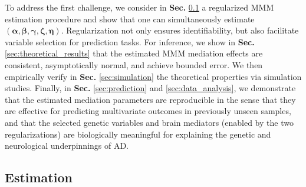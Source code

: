 \documentclass[
  12pt]{article}
\def\M{\mathbf{m}}
\begin{document}
To address the first challenge, we consider in \textbf{Sec.} \ref{sec:estimation-procedure} a regularized MMM estimation procedure and show that one can simultaneously estimate $(\bm{\alpha},\bm{\beta}, \bm{\gamma},\bm{\zeta},\bm{\eta})$. Regularization not only ensures identifiability, but also facilitate variable selection for prediction tasks.
For inference, we show in \textbf{Sec.} \ref{sec:theoretical_results} that the estimated MMM mediation effects are consistent, asymptotically normal, and achieve bounded error. We then empirically verify in \textbf{Sec.} \ref{sec:simulation} the theoretical properties via simulation studies. Finally, in  \textbf{Sec.} \ref{sec:prediction} and \ref{sec:data_analysis}, we demonstrate that the estimated mediation parameters are reproducible in the sense that they are effective for predicting multivariate outcomes in previously unseen samples, and that the selected genetic variables and brain mediators (enabled by the two regularizations) are biologically meaningful for explaining the genetic and neurological underpinnings of AD.






\vspace{-.75em}
\subsection{Estimation}
\label{sec:estimation-procedure}
\vspace{-.25em}
\end{document}
